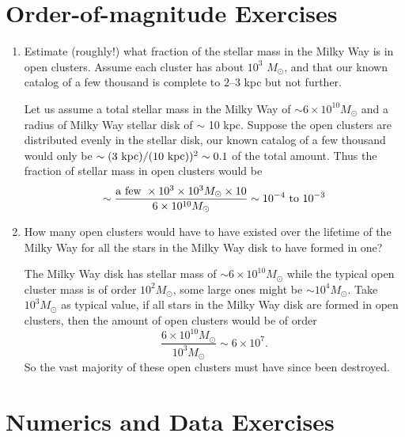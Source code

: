 \section{Order-of-magnitude Exercises}

\begin{enumerate} 
\item Estimate (roughly!) what fraction of the stellar mass in
the Milky Way is in open clusters. Assume each cluster has about
    $10^3$ $M_\odot$, and that our known catalog of a few thousand is
    complete to $2$--$3$ kpc but not further.

\begin{answer}
Let us assume a total stellar mass in the Milky Way of $\sim 6 \times
10^{10} M_\odot$ and a radius of Milky Way stellar disk of $\sim$ 10
kpc. Suppose the open clusters are distributed evenly in the stellar
disk, our known catalog of a few thousand would only be $\sim (3 {\rm
~kpc}) / (10 {\rm ~kpc}))^2 \sim 0.1 $ of the total amount. Thus the
fraction of stellar mass in open clusters would be
\begin{equation}
\sim \frac{{\rm a~few~} \times 10^3 \times 10^3 M_\odot \times
10}{6 \times 10^{10} M_\odot} \sim 10^{-4} {\rm ~to~} 10^{-3}
\end{equation}
\end{answer}

\item How many open clusters would have to have existed over the
    lifetime of the Milky Way for all the stars in the Milky Way disk
to have formed in one?

\begin{answer}
The Milky Way disk has stellar mass of $\sim 6 \times 10^{10} M_\odot$
while the typical open cluster mass is of order $10^2 M_\odot$, some
large ones might be $\sim 10^4 M_\odot$. Take $10^3 M_\odot$ as
typical value, if all stars in the Milky Way disk are formed in open
clusters, then the amount of open clusters would be of order
\begin{equation}
\frac{6\times10^{10}M_\odot}{10^3 M_\odot}\sim 6\times 10^7.
\end{equation}
So the vast majority of these open clusters must have since been
destroyed.
\end{answer}

\end{enumerate} 

\section{Numerics and Data Exercises}

